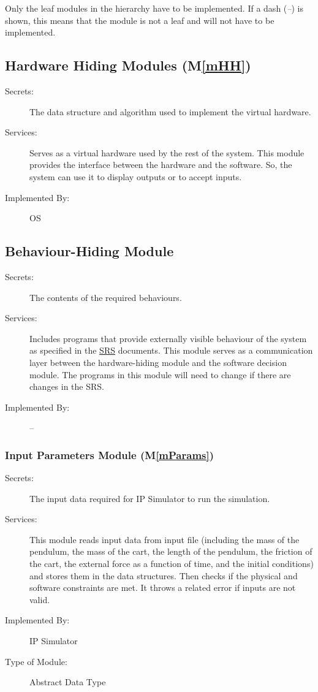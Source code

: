 \documentclass[12pt, titlepage]{article}
\newcommand{\mref}[1]{M\ref{#1}}
\begin{document}
Only the leaf modules in the hierarchy have to be implemented. If a dash
(\emph{--}) is shown, this means that the module is not a leaf and will not have to be implemented.

\subsection{Hardware Hiding Modules (\mref{mHH})}

\begin{description}
\item[Secrets:]The data structure and algorithm used to implement the virtual hardware.
\item[Services:]Serves as a virtual hardware used by the rest of the
  system. This module provides the interface between the hardware and the
  software. So, the system can use it to display outputs or to accept inputs.
\item[Implemented By:] OS
\end{description}

\subsection{Behaviour-Hiding Module}

\begin{description}
\item[Secrets:] The contents of the required behaviours.
\item[Services:] Includes programs that provide externally visible behaviour of
  the system as specified in the \href{https://github.com/MinMah23/CAS741-Project/tree/main/docs/SRS}{SRS}
  documents. This module serves as a communication layer between the
  hardware-hiding module and the software decision module. The programs in this
  module will need to change if there are changes in the SRS.
\item[Implemented By:] --
\end{description}

\subsubsection{Input Parameters Module (\mref{mParams})}

\begin{description}
\item[Secrets:] The input data required for IP Simulator to run the simulation.

\item[Services:]This module reads input data from input file (including the mass of the pendulum, the mass of the cart, the length of the pendulum, the friction of the cart, the external force as a function of time, and the initial conditions) and stores them in the data structures. Then checks if the physical and software constraints are met. It throws a related error if inputs are not valid.
\item[Implemented By:] IP Simulator
\item[Type of Module:] Abstract Data Type
\end{description}
\end{document}
